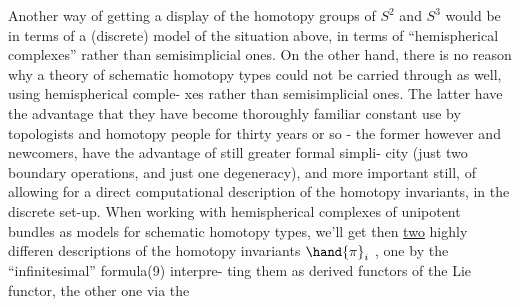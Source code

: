 \margin{!\ \rule{0.4pt}{3\baselineskip}}Another way of getting a display of the homotopy groups of $S^2$ and
$S^3$ would be in terms of a (discrete) model of the situation above,  in
terms of ``hemispherical complexes'' rather than semisimplicial ones.  On
the other hand,  there is no reason why a theory of schematic homotopy
types could not be carried through as well,  using hemispherical comple-%
xes rather than semisimplicial ones.  The latter  have the advantage 
that they have become   thoroughly familiar   constant use
by topologists and homotopy people for thirty years or so  -  the former
however and newcomers,  have the advantage of still greater formal simpli-%
city (just two boundary operations,  and just one degeneracy),  and more
important still,  of allowing for a direct computational description of
the homotopy invariants,  in the discrete set-up.  When working with
hemispherical complexes of unipotent bundles as models for schematic
homotopy types,  we'll get then \uline{two} highly differen descriptions of the
homotopy invariants $\hand{\pi}_i$ ,  one by the ``infinitesimal'' formula(9)  interpre-%
ting them as derived functors of the Lie functor,  the other one via the



